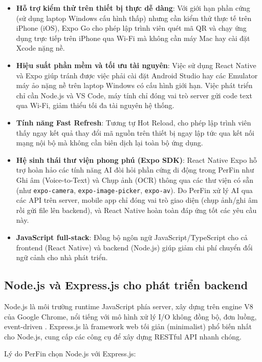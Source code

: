 \begin{itemize}
    \item \textbf{Hỗ trợ kiểm thử trên thiết bị thực dễ dàng}: Với giới hạn phần cứng (sử dụng laptop Windows cấu hình thấp) nhưng cần kiểm thử thực tế trên iPhone (iOS), Expo Go cho phép lập trình viên quét mã QR và chạy ứng dụng trực tiếp trên iPhone qua Wi-Fi mà không cần máy Mac hay cài đặt Xcode nặng nề.
    \item \textbf{Hiệu suất phần mềm và tối ưu tài nguyên}: Việc sử dụng React Native và Expo giúp tránh được việc phải cài đặt Android Studio hay các Emulator máy ảo nặng nề trên laptop Windows có cấu hình giới hạn. Việc phát triển chỉ cần Node.js và VS Code, máy tính chỉ đóng vai trò server gửi code text qua Wi-Fi, giảm thiểu tối đa tài nguyên hệ thống.
    \item \textbf{Tính năng Fast Refresh}: Tương tự Hot Reload, cho phép lập trình viên thấy ngay kết quả thay đổi mã nguồn trên thiết bị ngay lập tức qua kết nối mạng nội bộ mà không cần biên dịch lại toàn bộ ứng dụng.
    \item \textbf{Hệ sinh thái thư viện phong phú (Expo SDK)}: React Native Expo hỗ trợ hoàn hảo các tính năng AI đòi hỏi phần cứng di động trong PerFin như Ghi âm (Voice-to-Text) và Chụp ảnh (OCR) thông qua các thư viện có sẵn (như \texttt{expo-camera}, \texttt{expo-image-picker}, \texttt{expo-av}). Do PerFin xử lý AI qua các API trên server, mobile app chỉ đóng vai trò giao diện (chụp ảnh/ghi âm rồi gửi file lên backend), và React Native hoàn toàn đáp ứng tốt các yêu cầu này.
    \item \textbf{JavaScript full-stack}: Đồng bộ ngôn ngữ JavaScript/TypeScript cho cả frontend (React Native) và backend (Node.js) giúp giảm chi phí chuyển đổi ngữ cảnh cho nhà phát triển.
\end{itemize}

\subsection{Node.js và Express.js cho phát triển backend}
\label{subsec:nodejs_express}

Node.js là môi trường runtime JavaScript phía server, xây dựng trên engine V8 của Google Chrome, nổi tiếng với mô hình xử lý I/O không đồng bộ, đơn luồng, event-driven \cite{ref16}. Express.js là framework web tối giản (minimalist) phổ biến nhất cho Node.js, cung cấp các công cụ để xây dựng RESTful API nhanh chóng.

Lý do PerFin chọn Node.js với Express.js:

